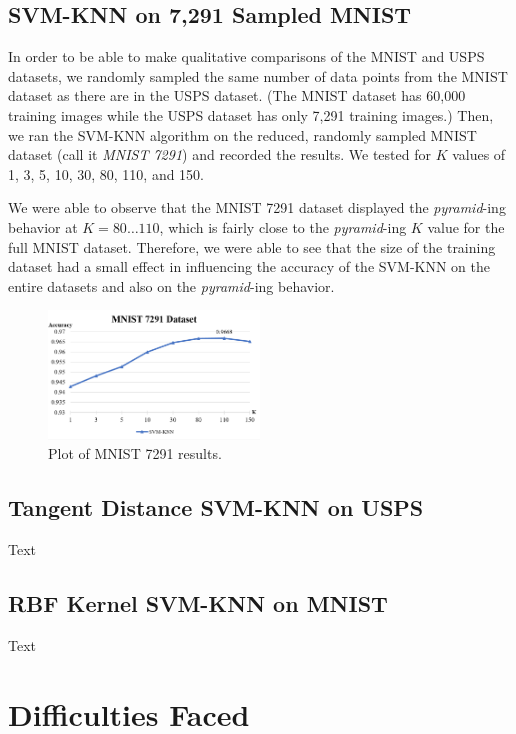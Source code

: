 \documentclass[11pt,letterpaper]{article}
\begin{document}
\subsection{SVM-KNN on 7,291 Sampled MNIST}

In order to be able to make qualitative comparisons of the MNIST and USPS datasets, we randomly sampled the same number of data points from the MNIST dataset as there are in the USPS dataset. (The MNIST dataset has 60,000 training images while the USPS dataset has only 7,291 training images.) Then, we ran the SVM-KNN algorithm on the reduced, randomly sampled MNIST dataset (call it \textit{MNIST 7291}) and recorded the results. We tested for $K$ values of 1, 3, 5, 10, 30, 80, 110, and 150.

We were able to observe that the MNIST 7291 dataset displayed the \textit{pyramid}-ing behavior at $K=80\dots 110$, which is fairly close to the \textit{pyramid}-ing $K$ value for the full MNIST dataset. Therefore, we were able to see that the size of the training dataset had a small effect in influencing the accuracy of the SVM-KNN on the entire datasets and also on the \textit{pyramid}-ing behavior.

\begin{figure}[t!]
  \centering
  \includegraphics[keepaspectratio, width=0.5\textwidth]{mnist_7291.png}
  \caption{Plot of MNIST 7291 results.}
\end{figure}


\subsection{Tangent Distance SVM-KNN on USPS}

Text

\subsection{RBF Kernel SVM-KNN on MNIST}

Text

\section{Difficulties Faced}
\end{document}
